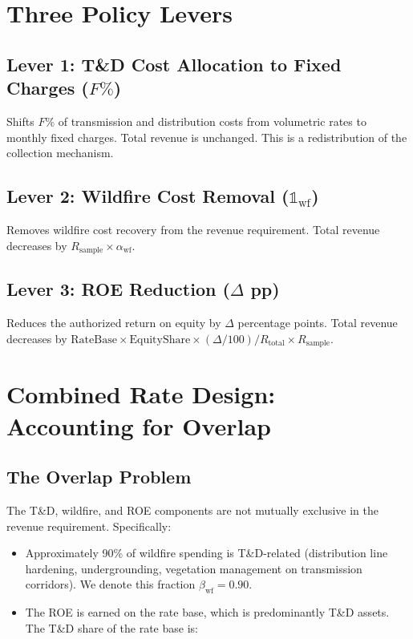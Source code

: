 \documentclass[11pt]{article}
\begin{document}
\section{Three Policy Levers}

\subsection{Lever 1: T\&D Cost Allocation to Fixed Charges ($F\%$)}

Shifts $F\%$ of transmission and distribution costs from volumetric rates to monthly fixed charges. Total revenue is unchanged. This is a redistribution of the collection mechanism.

\subsection{Lever 2: Wildfire Cost Removal ($\mathbb{1}_{\text{wf}}$)}

Removes wildfire cost recovery from the revenue requirement. Total revenue decreases by $R_{\text{sample}} \times \alpha_{\text{wf}}$.

\subsection{Lever 3: ROE Reduction ($\Delta$ pp)}

Reduces the authorized return on equity by $\Delta$ percentage points. Total revenue decreases by $\text{RateBase} \times \text{EquityShare} \times (\Delta/100) / R_{\text{total}} \times R_{\text{sample}}$.

\section{Combined Rate Design: Accounting for Overlap}

\subsection{The Overlap Problem}

The T\&D, wildfire, and ROE components are not mutually exclusive in the revenue requirement. Specifically:

\begin{itemize}
\item Approximately 90\% of wildfire spending is T\&D-related (distribution line hardening, undergrounding, vegetation management on transmission corridors). We denote this fraction $\beta_{\text{wf}} = 0.90$.

\item The ROE is earned on the rate base, which is predominantly T\&D assets. The T\&D share of the rate base is:
\end{itemize}
\end{document}
